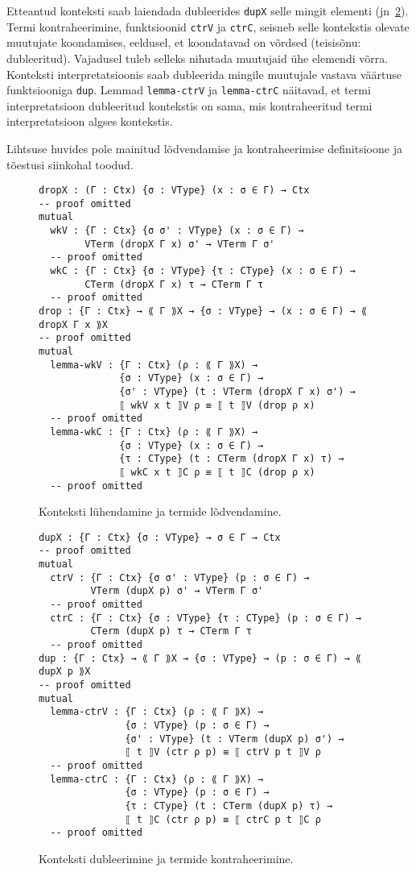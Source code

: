 \documentclass[a4paper,12pt]{article}
\begin{document}
Etteantud konteksti saab laiendada dubleerides {\tt dupX} selle mingit elementi (jn~\ref{fig:contraction}).
Termi kontraheerimine, funktsioonid {\tt ctrV} ja {\tt ctrC}, seisneb selle kontekstis olevate muutujate koondamises, eeldusel, et koondatavad on võrdsed (teisisõnu: dubleeritud).
Vajadusel tuleb selleks nihutada muutujaid ühe elemendi võrra.
Konteksti interpretatsioonis saab dubleerida mingile muutujale vastava väärtuse funktsiooniga {\tt dup}.
Lemmad {\tt lemma-ctrV} ja {\tt lemma-ctrC} näitavad, et termi interpretatsioon dubleeritud kontekstis on sama, mis kontraheeritud termi interpretatsioon algses kontekstis.

Lihtsuse huvides pole mainitud lõdvendamise ja kontraheerimise definitsioone ja tõestusi siinkohal toodud.
\begin{figure}
  \begin{BVerbatim}
dropX : (Γ : Ctx) {σ : VType} (x : σ ∈ Γ) → Ctx
-- proof omitted
mutual
  wkV : {Γ : Ctx} {σ σ' : VType} (x : σ ∈ Γ) →
        VTerm (dropX Γ x) σ' → VTerm Γ σ'
  -- proof omitted
  wkC : {Γ : Ctx} {σ : VType} {τ : CType} (x : σ ∈ Γ) →
        CTerm (dropX Γ x) τ → CTerm Γ τ
  -- proof omitted
drop : {Γ : Ctx} → ⟪ Γ ⟫X → {σ : VType} → (x : σ ∈ Γ) → ⟪ dropX Γ x ⟫X 
-- proof omitted
mutual
  lemma-wkV : {Γ : Ctx} (ρ : ⟪ Γ ⟫X) →
              {σ : VType} (x : σ ∈ Γ) →
              {σ' : VType} (t : VTerm (dropX Γ x) σ') →
              ⟦ wkV x t ⟧V ρ ≡ ⟦ t ⟧V (drop ρ x)
  -- proof omitted
  lemma-wkC : {Γ : Ctx} (ρ : ⟪ Γ ⟫X) →
              {σ : VType} (x : σ ∈ Γ) →
              {τ : CType} (t : CTerm (dropX Γ x) τ) →
              ⟦ wkC x t ⟧C ρ ≡ ⟦ t ⟧C (drop ρ x)
  -- proof omitted
\end{BVerbatim}
  \caption{Konteksti lühendamine ja termide lõdvendamine.}
  \label{fig:weakening}
\end{figure}

\begin{figure}
  \begin{BVerbatim}
dupX : {Γ : Ctx} {σ : VType} → σ ∈ Γ → Ctx
-- proof omitted
mutual
  ctrV : {Γ : Ctx} {σ σ' : VType} (p : σ ∈ Γ) →
         VTerm (dupX p) σ' → VTerm Γ σ'
  -- proof omitted
  ctrC : {Γ : Ctx} {σ : VType} {τ : CType} (p : σ ∈ Γ) →
         CTerm (dupX p) τ → CTerm Γ τ
  -- proof omitted
dup : {Γ : Ctx} → ⟪ Γ ⟫X → {σ : VType} → (p : σ ∈ Γ) → ⟪ dupX p ⟫X
-- proof omitted
mutual
  lemma-ctrV : {Γ : Ctx} (ρ : ⟪ Γ ⟫X) →
               {σ : VType} (p : σ ∈ Γ) →
               {σ' : VType} (t : VTerm (dupX p) σ') →
               ⟦ t ⟧V (ctr ρ p) ≡ ⟦ ctrV p t ⟧V ρ
  -- proof omitted
  lemma-ctrC : {Γ : Ctx} (ρ : ⟪ Γ ⟫X) →
               {σ : VType} (p : σ ∈ Γ) →
               {τ : CType} (t : CTerm (dupX p) τ) →
               ⟦ t ⟧C (ctr ρ p) ≡ ⟦ ctrC p t ⟧C ρ
  -- proof omitted
  \end{BVerbatim}
  \caption{Konteksti dubleerimine ja termide kontraheerimine.}
  \label{fig:contraction}
\end{figure}
\end{document}
